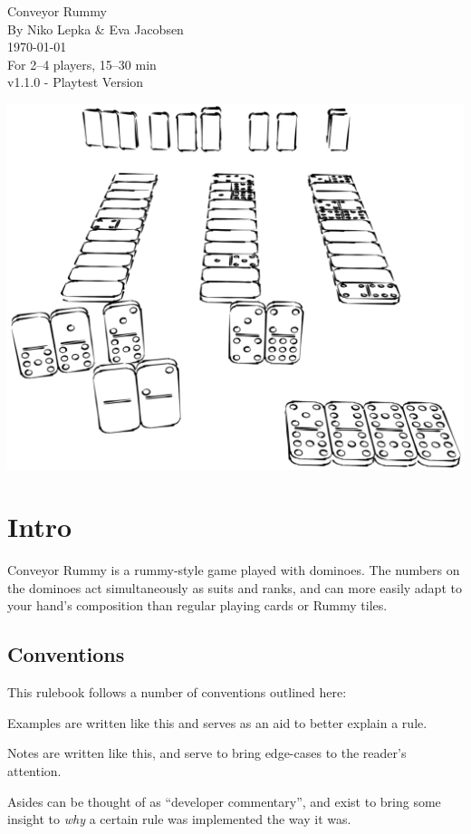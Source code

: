 


\begin{center}
  \huge Conveyor Rummy\\
  \Large By Niko Lepka \& Eva Jacobsen\\
  \normalsize \today\\
  \large For 2--4 players, 15--30 min\\
  \footnotesize v1.1.0 - Playtest Version
\end{center}

\noindent\includegraphics[width = \linewidth]{graphics/dominoes-gameplay.png}
\newpage
\section*{Intro}
Conveyor Rummy is a rummy-style game played with dominoes. 
The numbers on the dominoes act simultaneously as suits and ranks, and can more easily adapt to your hand's composition than regular playing cards or Rummy tiles.

\subsection*{Conventions}
This rulebook follows a number of conventions outlined here:

\example Examples are written like this and serves as an aid to better explain a rule.

\note Notes are written like this, and serve to bring edge-cases to the reader's attention.

\aside Asides can be thought of as ``developer commentary'', and exist to bring some insight to \textit{why} a certain rule was implemented the way it was.
\newpage
\tableofcontents
\newpage







\newpage


